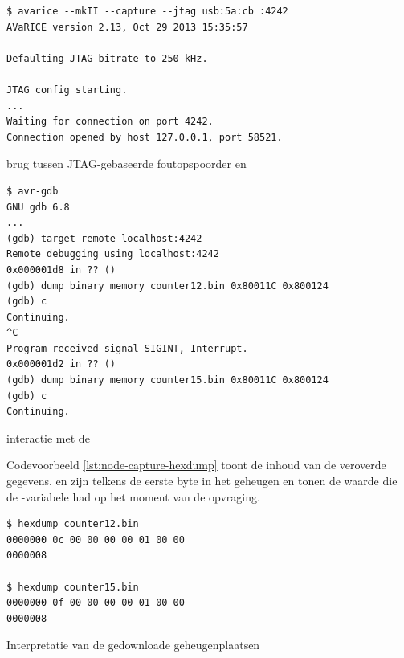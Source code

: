 \begin{listing}[ht]
  \begin{verbatim}
$ avarice --mkII --capture --jtag usb:5a:cb :4242
AVaRICE version 2.13, Oct 29 2013 15:35:57

Defaulting JTAG bitrate to 250 kHz.

JTAG config starting.
...
Waiting for connection on port 4242.
Connection opened by host 127.0.0.1, port 58521.
  \end{verbatim}
  \vspace{-5mm}
  \caption{ brug tussen JTAG-gebaseerde foutopspoorder en }
  \label{lst:node-capture-avarice}
\end{listing}

\begin{listing}[ht]
  \begin{verbatim}
$ avr-gdb
GNU gdb 6.8
...
(gdb) target remote localhost:4242
Remote debugging using localhost:4242
0x000001d8 in ?? ()
(gdb) dump binary memory counter12.bin 0x80011C 0x800124
(gdb) c
Continuing.
^C
Program received signal SIGINT, Interrupt.
0x000001d2 in ?? ()
(gdb) dump binary memory counter15.bin 0x80011C 0x800124
(gdb) c
Continuing.
  \end{verbatim}
  \vspace{-5mm}
  \caption{ interactie met de \mcu}
  \label{lst:node-capture-gdb}
\end{listing}

Codevoorbeeld \ref{lst:node-capture-hexdump} toont de inhoud van de veroverde
gegevens.  en  zijn telkens de eerste byte in het geheugen en
tonen de waarde die de -variabele had op het moment van de
opvraging.

\begin{listing}[ht]
  \begin{verbatim}
$ hexdump counter12.bin 
0000000 0c 00 00 00 00 01 00 00                        
0000008

$ hexdump counter15.bin 
0000000 0f 00 00 00 00 01 00 00                        
0000008
  \end{verbatim}
  \vspace{-5mm}
  \caption{Interpretatie van de gedownloade geheugenplaatsen}
  \label{lst:node-capture-hexdump}
\end{listing}

